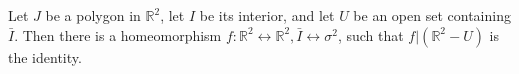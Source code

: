 Let $J$ be a polygon in $\mathbb{R}^2$, let $I$ be its interior, and let $U$ be an open set containing $\bar{I}$. Then there is a homeomorphism $f: \mathbb{R}^2 \leftrightarrow \mathbb{R}^2, \bar{I} \leftrightarrow \sigma^2$, such that $f|(\mathbb{R}^2 - U)$ is the identity.
